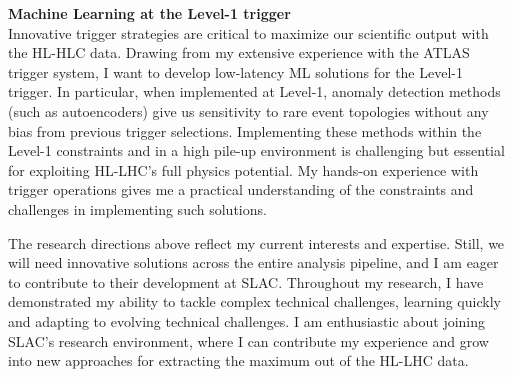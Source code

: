 \documentclass[11pt, a4paper]{awesome-cv}
\begin{document}
\begin{cvletter}
  \textbf{Machine Learning at the Level-1 trigger}\\
  Innovative trigger strategies are critical to maximize our scientific output with the HL-HLC data. Drawing from my extensive experience with the ATLAS trigger system, I want to develop low-latency ML solutions for the Level-1 trigger. In particular, when implemented at Level-1, anomaly detection methods (such as autoencoders) give us sensitivity to rare event topologies without any bias from previous trigger selections. Implementing these methods within the Level-1 constraints and in a high pile-up environment is challenging but essential for exploiting HL-LHC's full physics potential. My hands-on experience with trigger operations gives me a practical understanding of the constraints and challenges in implementing such solutions.
  
  The research directions above reflect my current interests and expertise. Still, we will need innovative solutions across the entire analysis pipeline, and I am eager to contribute to their development at SLAC. Throughout my research, I have demonstrated my ability to tackle complex technical challenges, learning quickly and adapting to evolving technical challenges. I am enthusiastic about joining SLAC's research environment, where I can contribute my experience and grow into new approaches for extracting the maximum out of the HL-LHC data.

\end{cvletter}

\makeletterclosing
\end{document}
